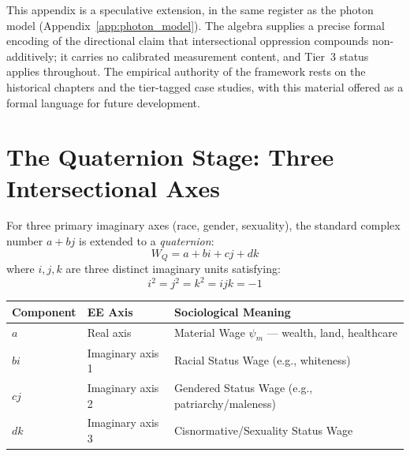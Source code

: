 This appendix is a speculative extension, in the same register as the photon model (Appendix~\ref{app:photon_model}). The algebra supplies a precise formal encoding of the directional claim that intersectional oppression compounds non-additively; it carries no calibrated measurement content, and Tier~3 status applies throughout. The empirical authority of the framework rests on the historical chapters and the tier-tagged case studies, with this material offered as a formal language for future development.

\section{The Quaternion Stage: Three Intersectional Axes}

For three primary imaginary axes (race, gender, sexuality), the standard complex number $a + bj$ is extended to a \emph{quaternion}:
\begin{equation}\label{eq:ga.quaternion}
W_Q = a + bi + cj + dk
\end{equation}
where $i, j, k$ are three distinct imaginary units satisfying:
\begin{equation}\label{eq:ga.quaternion-rules}
i^2 = j^2 = k^2 = ijk = -1
\end{equation}

\begin{center}
\begin{tabular}{lll}
\toprule
Component & EE Axis & Sociological Meaning \\
\midrule
$a$ & Real axis & Material Wage $\psi_m$ --- wealth, land, healthcare \\
$bi$ & Imaginary axis 1 & Racial Status Wage (e.g., whiteness) \\
$cj$ & Imaginary axis 2 & Gendered Status Wage (e.g., patriarchy/maleness) \\
$dk$ & Imaginary axis 3 & Cisnormative/Sexuality Status Wage \\
\bottomrule
\end{tabular}
\end{center}

